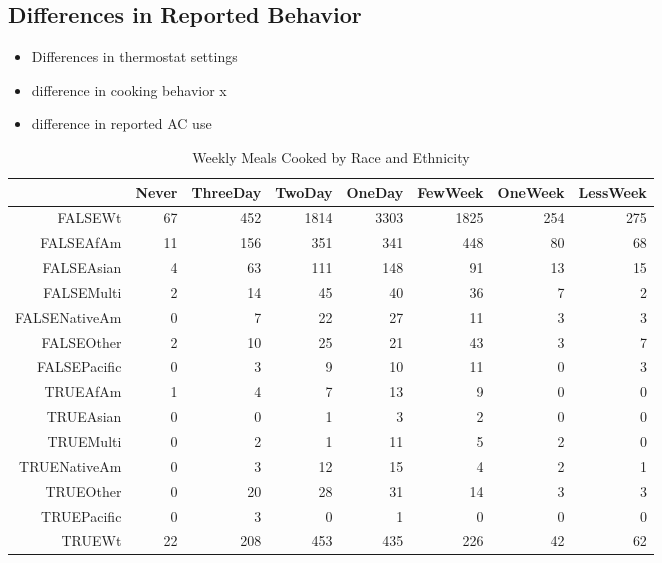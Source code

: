 \documentclass{article}
\begin{document}
\subsection{Differences in Reported Behavior}
  
  \begin{itemize}
    \item Differences in thermostat settings
    \item difference in cooking behavior x
    \item difference in reported AC use

  \end{itemize}
  
  
\begin{table}[ht]
\centering
\begin{tabular}{rrrrrrrr}
  \hline
 & Never & ThreeDay & TwoDay & OneDay & FewWeek & OneWeek & LessWeek \\ 
  \hline
FALSEWt &  67 & 452 & 1814 & 3303 & 1825 & 254 & 275 \\ 
  FALSEAfAm &  11 & 156 & 351 & 341 & 448 &  80 &  68 \\ 
  FALSEAsian &   4 &  63 & 111 & 148 &  91 &  13 &  15 \\ 
  FALSEMulti &   2 &  14 &  45 &  40 &  36 &   7 &   2 \\ 
  FALSENativeAm &   0 &   7 &  22 &  27 &  11 &   3 &   3 \\ 
  FALSEOther &   2 &  10 &  25 &  21 &  43 &   3 &   7 \\ 
  FALSEPacific &   0 &   3 &   9 &  10 &  11 &   0 &   3 \\ 
  TRUEAfAm &   1 &   4 &   7 &  13 &   9 &   0 &   0 \\ 
  TRUEAsian &   0 &   0 &   1 &   3 &   2 &   0 &   0 \\ 
  TRUEMulti &   0 &   2 &   1 &  11 &   5 &   2 &   0 \\ 
  TRUENativeAm &   0 &   3 &  12 &  15 &   4 &   2 &   1 \\ 
  TRUEOther &   0 &  20 &  28 &  31 &  14 &   3 &   3 \\ 
  TRUEPacific &   0 &   3 &   0 &   1 &   0 &   0 &   0 \\ 
  TRUEWt &  22 & 208 & 453 & 435 & 226 &  42 &  62 \\ 
   \hline
\end{tabular}
\caption{Weekly Meals Cooked by Race and Ethnicity} 
\label{tab:Cooking}
\end{table}
\end{document}
